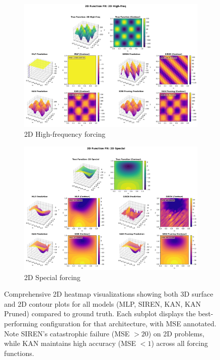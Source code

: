 \documentclass[11pt,a4paper]{article}
\begin{document}
\begin{figure}[htbp]
\begin{subfigure}{0.48\textwidth}
\includegraphics[width=\textwidth]{../section1/visualization/heatmap_2d_dataset_2_2D_High-freq_20251023_031942.png}
\caption{2D High-frequency forcing}
\end{subfigure}
\hfill
\begin{subfigure}{0.48\textwidth}
\includegraphics[width=\textwidth]{../section1/visualization/heatmap_2d_dataset_3_2D_Special_20251023_031942.png}
\caption{2D Special forcing}
\end{subfigure}
\caption{Comprehensive 2D heatmap visualizations showing both 3D surface and 2D contour plots for all models (MLP, SIREN, KAN, KAN Pruned) compared to ground truth. Each subplot displays the best-performing configuration for that architecture, with MSE annotated. Note SIREN's catastrophic failure (MSE $> 20$) on 2D problems, while KAN maintains high accuracy (MSE $< 1$) across all forcing functions.}
\label{fig:2d_heatmaps}
\end{figure}
\end{document}
